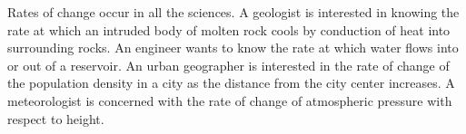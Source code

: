 \documentclass{book}
\begin{document}
%
%
%
%
%
%
%

Rates of change occur in all the sciences. A geologist is interested in knowing the rate at which an intruded body of molten rock cools by conduction of heat into surrounding rocks. An engineer wants to know the rate at which water flows into or out of a reservoir. An urban geographer is interested in the rate of change of the population density in a city as the distance from the city center increases. A meteorologist is concerned with the rate of change of atmospheric pressure with respect to height.\\
\end{document}
